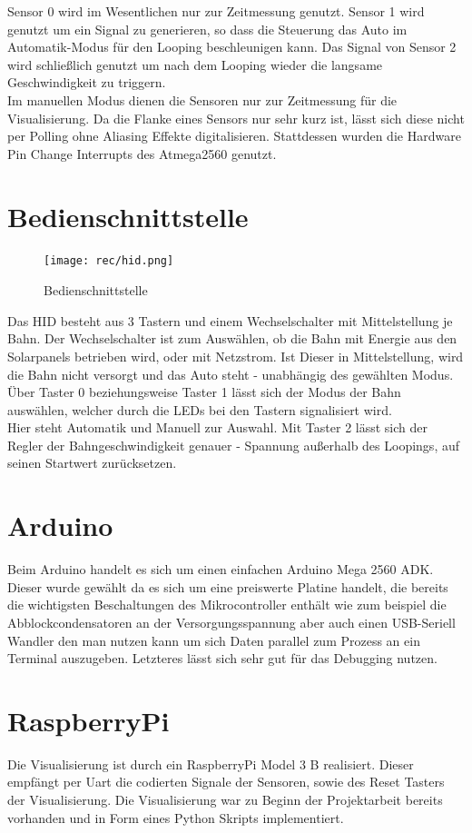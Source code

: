 \documentclass[a4paper, 11pt]{report}
\begin{document}
		Sensor 0 wird im Wesentlichen nur zur Zeitmessung genutzt.
		Sensor 1 wird genutzt um ein Signal zu generieren, so dass die Steuerung das Auto im Automatik-Modus für den Looping beschleunigen kann.
		Das Signal von Sensor 2 wird schließlich genutzt um nach dem Looping wieder die langsame Geschwindigkeit zu triggern.\\

		Im manuellen Modus dienen die Sensoren nur zur Zeitmessung für die Visualisierung.
		Da die Flanke eines Sensors nur sehr kurz ist, lässt sich diese nicht per Polling ohne Aliasing Effekte digitalisieren. Stattdessen wurden die Hardware	Pin Change Interrupts des Atmega2560 genutzt.
	\section{Bedienschnittstelle}
		\begin{figure}[ht]
			\centering
			\texttt{[image: rec/hid.png]}
			\caption{Bedienschnittstelle}
			\label{img:hid}
		\end{figure}
		Das HID besteht aus 3 Tastern und einem Wechselschalter mit Mittelstellung je Bahn.
		Der Wechselschalter ist zum Auswählen, ob die Bahn mit Energie aus den Solarpanels betrieben wird, oder mit Netzstrom. Ist Dieser in Mittelstellung, wird die Bahn nicht versorgt und das Auto steht - unabhängig des gewählten Modus.
		Über Taster 0 beziehungsweise Taster 1 lässt sich der Modus der Bahn auswählen, welcher durch die LEDs bei den Tastern signalisiert wird. \\Hier steht Automatik und Manuell zur Auswahl.
		Mit Taster 2 lässt sich der Regler der Bahngeschwindigkeit genauer -  Spannung außerhalb des Loopings, auf seinen Startwert zurücksetzen.
	\section{Arduino}
		Beim Arduino handelt es sich um einen einfachen Arduino Mega 2560 ADK.\\
		Dieser wurde gewählt da es sich um eine preiswerte Platine handelt, die bereits die wichtigsten Beschaltungen des Mikrocontroller enthält wie zum beispiel die Abblockcondensatoren an der Versorgungsspannung aber auch einen USB-Seriell Wandler den man nutzen kann um sich Daten parallel zum Prozess an ein Terminal auszugeben.
		Letzteres lässt sich sehr gut für das Debugging nutzen.
	\section{RaspberryPi}
		Die Visualisierung ist durch ein RaspberryPi Model 3 B realisiert. Dieser empfängt per Uart die codierten Signale der Sensoren, sowie des Reset Tasters der Visualisierung.
		Die Visualisierung war zu Beginn der Projektarbeit bereits vorhanden und in Form eines Python Skripts implementiert.
\end{document}
